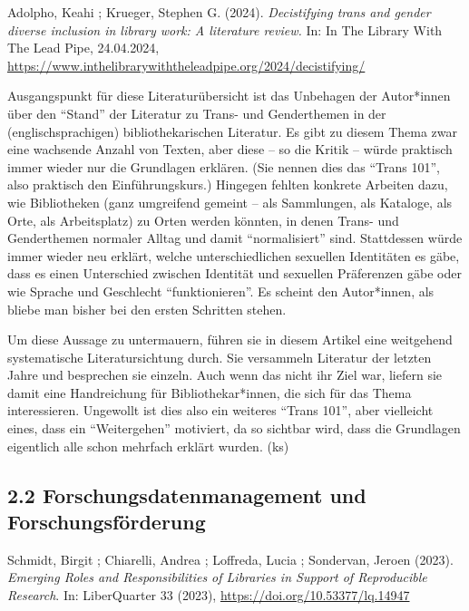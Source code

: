 \documentclass[a4paper,
fontsize=11pt,
oneside,
numbers=noperiodatend,
parskip=half-,
bibliography=totoc,
final
]{scrartcl}
\begin{document}
Adolpho, Keahi ; Krueger, Stephen G. (2024). \emph{Decistifying trans
and gender diverse inclusion in library work: A literature review.} In:
In The Library With The Lead Pipe, 24.04.2024,
\url{https://www.inthelibrarywiththeleadpipe.org/2024/decistifying/}

Ausgangspunkt für diese Literaturübersicht ist das Unbehagen der
Autor*innen über den \linebreak \enquote{Stand} der Literatur zu Trans- und
Genderthemen in der (englischsprachigen) bibliothekarischen Literatur.
Es gibt zu diesem Thema zwar eine wachsende Anzahl von Texten, aber
diese -- so die Kritik -- würde praktisch immer wieder nur die
Grundlagen erklären. (Sie nennen dies das \enquote{Trans 101}, also
praktisch den Einführungskurs.) Hingegen fehlten konkrete Arbeiten dazu,
wie Bibliotheken (ganz umgreifend gemeint -- als Sammlungen, als
Kataloge, als Orte, als Arbeitsplatz) zu Orten werden könnten, in denen
Trans- und Genderthemen normaler Alltag und damit \enquote{normalisiert}
sind. Stattdessen würde immer wieder neu erklärt, welche
unterschiedlichen sexuellen Identitäten es gäbe, dass es einen
Unterschied zwischen Identität und sexuellen Präferenzen gäbe oder wie
Sprache und Geschlecht \enquote{funktionieren}. Es scheint den
Autor*innen, als bliebe man bisher bei den ersten Schritten stehen.

Um diese Aussage zu untermauern, führen sie in diesem Artikel eine
weitgehend systematische Literatursichtung durch. Sie versammeln
Literatur der letzten Jahre und besprechen sie einzeln. Auch wenn das
nicht ihr Ziel war, liefern sie damit eine Handreichung für
Bibliothekar*innen, die sich für das Thema interessieren. Ungewollt ist
dies also ein weiteres \enquote{Trans 101}, aber vielleicht eines, dass
ein \enquote{Weitergehen} motiviert, da so sichtbar wird, dass die
Grundlagen eigentlich alle schon mehrfach erklärt wurden. (ks)

\hypertarget{forschungsdatenmanagement-und-forschungsfuxf6rderung}{%
\subsection{2.2 Forschungsdatenmanagement und
Forschungsförderung}\label{forschungsdatenmanagement-und-forschungsfuxf6rderung}}

Schmidt, Birgit ; Chiarelli, Andrea ; Loffreda, Lucia ; Sondervan,
Jeroen (2023). \emph{Emerging Roles and Responsibilities of Libraries in
Support of Reproducible Research}. In: LiberQuarter 33 (2023),
\url{https://doi.org/10.53377/lq.14947}
\end{document}
